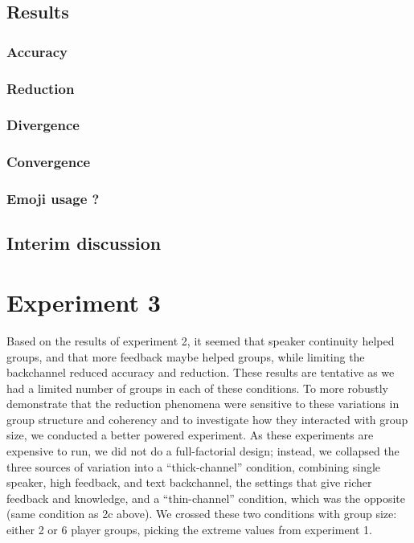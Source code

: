 \documentclass[
  english,
  a4paper,
]{article}
\begin{document}
\hypertarget{results-1}{%
\subsection{Results}\label{results-1}}

\hypertarget{accuracy}{%
\subsubsection{Accuracy}\label{accuracy}}

\hypertarget{reduction-1}{%
\subsubsection{Reduction}\label{reduction-1}}

\hypertarget{divergence-1}{%
\subsubsection{Divergence}\label{divergence-1}}

\hypertarget{convergence-1}{%
\subsubsection{Convergence}\label{convergence-1}}

\hypertarget{emoji-usage}{%
\subsubsection{Emoji usage ?}\label{emoji-usage}}

\hypertarget{interim-discussion-1}{%
\subsection{Interim discussion}\label{interim-discussion-1}}

\hypertarget{experiment-3}{%
\section{Experiment 3}\label{experiment-3}}

Based on the results of experiment 2, it seemed that speaker continuity helped groups, and that more feedback maybe helped groups, while limiting the backchannel reduced accuracy and reduction. These results are tentative as we had a limited number of groups in each of these conditions. To more robustly demonstrate that the reduction phenomena were sensitive to these variations in group structure and coherency and to investigate how they interacted with group size, we conducted a better powered experiment. As these experiments are expensive to run, we did not do a full-factorial design; instead, we collapsed the three sources of variation into a ``thick-channel'' condition, combining single speaker, high feedback, and text backchannel, the settings that give richer feedback and knowledge, and a ``thin-channel'' condition, which was the opposite (same condition as 2c above). We crossed these two conditions with group size: either 2 or 6 player groups, picking the extreme values from experiment 1.
\end{document}
